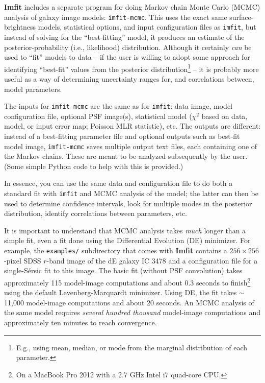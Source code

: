 \documentclass[10pt,a4paper,article]{memoir}
\newcommand{\Imfit}{\textbf{Imfit}}
\newcommand{\imfitprog}{\texttt{imfit}}
\newcommand{\imfitmcmc}{\texttt{imfit-mcmc}}
\newcommand{\chisquare}{\ensuremath{\chi^{2}}}
\begin{document}
\Imfit{} includes a separate program for doing Markov
chain Monte Carlo (MCMC) analysis of galaxy image models: \imfitmcmc.
This uses the exact same surface-brightness models, statistical options,
and input configuration files as \imfitprog, but instead of solving for
the ``best-fitting'' model, it produces an estimate of the
posterior-probability (i.e., likelihood) distribution. Although it
certainly \textit{can} be used to ``fit'' models to data -- if the user
is willing to adopt some approach for identifying ``best-fit'' values
from the posterior distribution\footnote{E.g., using mean, median, or
mode from the marginal distribution of each parameter.} -- it is
probably more useful as a way of determining uncertainty ranges for, and
correlations between, model parameters.

The inputs for \imfitmcmc{} are the same as for \imfitprog: data image,
model configuration file, optional PSF image(s), statistical model
(\chisquare{} based on data, model, or input error map; Poisson MLR
statistic), etc. The outputs are different: instead of a best-fitting
parameter file and optional outputs such as best-fit model image,
\imfitmcmc{} saves multiple output text files, each containing one of
the Markov chains. These are meant to be analyzed subsequently by the
user. (Some simple Python code to help with this is provided.)

In essence, you can use the same data and configuration file to do both a
standard fit with \imfitprog{} and MCMC analysis of the model; the
latter can then be used to determine confidence intervals, look for
multiple modes in the posterior distribution, identify correlations
between parameters, etc.

It is important to understand that MCMC analysis takes \textit{much}
longer than a simple fit, even a fit done using the Differential
Evolution (DE) minimizer. For example, the \texttt{examples/}
subdirectory that comes with \Imfit{} contains a $256 \times 256$-pixel
SDSS $r$-band image of the dE galaxy IC 3478 and a configuration file for a
single-S{\'e}rsic fit to this image. The basic fit (without PSF
convolution) takes approximately 115 model-image computations and about
0.3 seconds to finish\footnote{On a MacBook Pro 2012 with a 2.7 GHz
Intel i7 quad-core CPU.} using the default Levenberg-Marquardt
minimizer. Using DE, the fit takes $\sim$11,000 model-image computations
and about 20 seconds. An MCMC analysis of the same model requires
\textit{several hundred thousand} model-image computations and
approximately ten minutes to reach convergence.
\end{document}

